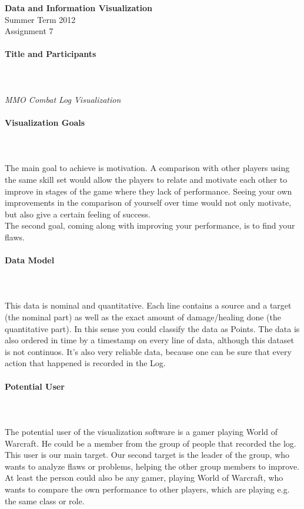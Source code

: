 \documentclass{scrartcl}
\begin{document}
\begin{center}
{\huge \textbf{Data and Information Visualization}}\\
Summer Term 2012\\
Assignment 7
\end{center}

\paragraph{Title and Participants}
\hfill \\ \hfill \\
\emph{MMO Combat Log Visualization}\\
\begin{itemize}

\end{itemize}

\paragraph{Visualization Goals}
\hfill \\ \hfill \\
The main goal to achieve is motivation. A comparison with other players using the same skill set would allow the players to relate and motivate each other to improve in stages of the game where they lack of performance. Seeing your own improvements in the comparison of yourself over time would not only motivate, but also give a certain feeling of success.\\
The second goal, coming along with improving your performance, is to find your flaws.

\paragraph{Data Model}
\hfill \\ \hfill \\
This data is nominal and quantitative. Each line contains a source and a target (the nominal part) as well as the exact amount of damage/healing done (the quantitative part). In this sense you could classify the data as Points. The data is also ordered in time by a timestamp on every line of data, although this dataset is not continuos. It's also very reliable data, because one can be sure that every action that happened is recorded in the Log. 

\paragraph{Potential User}
\hfill \\ \hfill \\
The potential user of the visualization software is a gamer playing World of Warcraft. He could be a member from the group of people that recorded the log. This user is our main target. Our second target is the leader of the group, who wants to analyze flaws or problems, helping the other group members to improve. At least the person could also be any gamer, playing World of Warcraft, who wants to compare the own performance to other players, which are playing e.g. the same class or role. 
\end{document}
